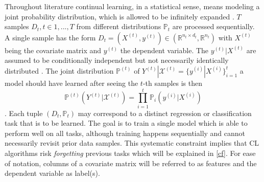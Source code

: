 Throughout literature continual learning, in a statistical sense, means modeling a joint probability distribution, which is allowed to be infinitely expanded \cite{LW}. $T$ samples $D_t, t \in {1, ...,T}$ from different distributions $\mathbb{P}_t$ are processed sequentially. A single sample has the form $D_t = (X^{(t)},y^{(t)}) \in (\mathbb{R}^{n_t \times d_t}, \mathbb{R}^{n_t})$ with $X^{(t)}$ being the covariate matrix and $y^{(t)}$ the dependent variable. The $y^{(t)}|X^{(t)}$ are assumed to be conditionally independent but not necessarily identically distributed \cite{LW}. The joint distribution $\mathbb{P}^{(t)}$ of $Y^{(t)}|\mathcal{X}^{(t)} = \{y^{(i)}|X^{(i)}\}_{i=1}^t$ a model should have learned after seeing the $t$-th samples is then
\begin{equation}
	\mathbb{P}^{(t)}(Y^{(t)}|\mathcal{X}^{(t)}) = \prod_{i = 1}^{t}\mathbb{P}_i(y^{(i)}|X^{(i)})
\end{equation}
. Each tuple $(D_t, \mathbb{P}_t)$ may correspond to a distinct regression or classification task that is to be learned. The goal is to train a single model which is able to perform well on all tasks, although training happens sequentially and cannot necessarily revisit prior data samples. This systematic constraint implies that CL algorithms risk \textit{forgetting} previous tasks which will be explained in \autoref{cf}. For ease of notation, columns of a covariate matrix will be referred to as features and the dependent variable as label(s).